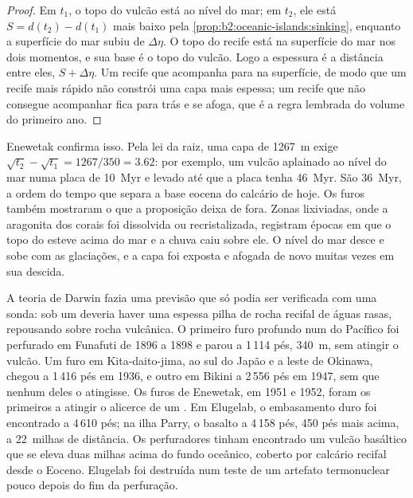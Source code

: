 \begin{proof}
Em $t_1$, o topo do vulcão está ao nível do mar; em $t_2$, ele está $S = d(t_2) - d(t_1)$ mais baixo pela
\cref{prop:b2:oceanic-islands:sinking}, enquanto a superfície do mar subiu de $\Delta\eta$. O topo
do recife está na superfície do mar nos dois momentos, e sua base é o topo do vulcão. Logo a
espessura é a distância entre eles, $S + \Delta\eta$. Um recife que acompanha para na
superfície, de modo que um recife mais rápido não constrói uma capa mais espessa; um recife que não consegue acompanhar fica para trás
e se afoga, que é a regra lembrada do volume do primeiro ano.
\end{proof}

Enewetak confirma isso. Pela lei da raiz, uma capa de \qty{1267}{m} exige $\sqrt{t_2} - \sqrt{t_1} =
1267/350 = 3.62$: por exemplo, um vulcão aplainado ao nível do mar numa placa de \qty{10}{Myr} e
levado até que a placa tenha \qty{46}{Myr}. São \qty{36}{Myr}, a ordem do tempo que
separa a base eocena do calcário de hoje. Os furos também mostraram o que a
proposição deixa de fora. Zonas lixiviadas, onde a aragonita dos corais foi dissolvida ou
recristalizada, registram épocas em que o topo do  esteve acima do mar e a chuva caiu sobre ele.
O nível do mar desce e sobe com as glaciações, e a capa foi exposta e afogada de novo muitas
vezes em sua descida.

\begin{history}
A teoria de Darwin fazia uma previsão que só podia ser verificada com uma sonda: sob um  deveria
haver uma espessa pilha de rocha recifal de águas rasas, repousando sobre rocha vulcânica. O primeiro furo profundo
num  do Pacífico foi perfurado em Funafuti de 1896 a 1898 e parou a 1\,114 pés,
\qty{340}{m}, sem atingir o vulcão. Um furo em Kita-daito-jima, ao sul do Japão e a leste de Okinawa,
chegou a 1\,416 pés em 1936, e outro em Bikini a 2\,556 pés em 1947, sem que nenhum deles o atingisse. Os furos de Enewetak, em
1951 e 1952, foram os primeiros a atingir o alicerce de um . Em Elugelab, o embasamento duro foi
encontrado a 4\,610 pés; na ilha Parry, o basalto a 4\,158 pés, 450 pés mais acima, a \num{22}~milhas
de distância. Os perfuradores tinham encontrado um vulcão basáltico que se eleva duas milhas acima do fundo oceânico, coberto
por calcário recifal desde o Eoceno. Elugelab foi destruída num teste de um artefato termonuclear
pouco depois do fim da perfuração.
\end{history}

